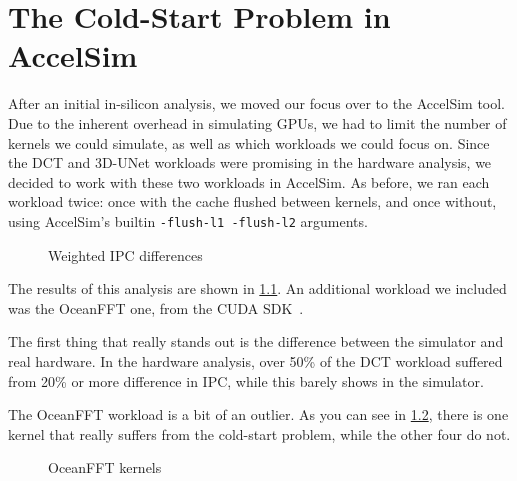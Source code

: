 \chapter{The Cold-Start Problem in AccelSim}\label{ch:sim-analysis}

After an initial in-silicon analysis, we moved our focus over to the AccelSim tool.
Due to the inherent overhead in simulating GPUs, we had to limit the number of kernels we could simulate, as well as which workloads we could focus on.
Since the DCT and 3D-UNet workloads were promising in the hardware analysis, we decided to work with these two workloads in AccelSim.
As before, we ran each workload twice: once with the cache flushed between kernels, and once without, using AccelSim's builtin \verb|-flush-l1 -flush-l2| arguments.

\begin{figure}[t]
    \centering
    \begin{minipage}[c]{0.45\textwidth}
        \resizebox{\textwidth}{!}{}
    \end{minipage}
    \begin{minipage}[c]{0.45\textwidth}
        \resizebox{\textwidth}{!}{}
    \end{minipage}
    \caption{Weighted IPC differences}
    \label{fig:sim_ipc_diff}
\end{figure}

The results of this analysis are shown in \cref{fig:sim_ipc_diff}.
An additional workload we included was the OceanFFT one, from the CUDA SDK\ .

The first thing that really stands out is the difference between the simulator and real hardware.
In the hardware analysis, over 50\% of the DCT workload suffered from 20\% or more difference in IPC, while this barely shows in the simulator.

The OceanFFT workload is a bit of an outlier.
As you can see in \cref{fig:ocean_kernels}, there is one kernel that really suffers from the cold-start problem, while the other four do not.

\begin{figure}[b]
    \centering
    
    \caption{OceanFFT kernels}
    \label{fig:ocean_kernels}
\end{figure}